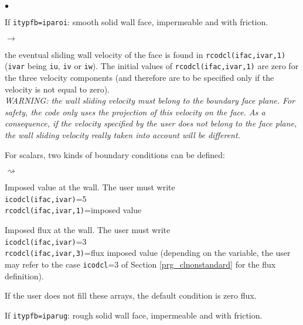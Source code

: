 {{{\begin{list}{$\bullet$}{}
\item If \texttt{itypfb=iparoi}: smooth solid wall face, impermeable and with friction.

\begin{list}{$\rightarrow$}{}
\item the eventual sliding wall velocity of the face is
      found in \texttt{rcodcl(ifac,ivar,1)} (\texttt{ivar} being
      \texttt{iu}, \texttt{iv} or \texttt{iw}). The initial
      values of \texttt{rcodcl(ifac,ivar,1)} are zero for
      the three velocity components (and therefore are to be specified
      only if the velocity is not equal to zero). \\
{\em WARNING: the wall sliding velocity must belong to the boundary face
      plane. For safety, the code only uses the projection of this
      velocity on the face. As a consequence, if the velocity specified
      by the user does not belong to the face plane, the wall sliding velocity really
      taken into account will be different.}

\item For scalars, two kinds of boundary conditions can be
      defined:
\begin{list}{$\rightsquigarrow$}{}
\item Imposed value at the wall. The user must write\\
\hspace*{1cm}\texttt{icodcl(ifac,ivar)}=5\\
\hspace*{1cm}\texttt{rcodcl(ifac,ivar,1)}=imposed value\\
\item Imposed flux at the wall. The user must write\\
\hspace*{1cm}\texttt{icodcl(ifac,ivar)}=3\\
\hspace*{1cm}\texttt{rcodcl(ifac,ivar,3)}=flux imposed value (depending on the variable, the user may refer to the case \texttt{icodcl}=3 of Section \ref{prg_clnonstandard} for the flux definition).
\item If the user does not fill these arrays, the default condition
      is zero flux.
\end{list}
\end{list}

\item If \texttt{itypfb=iparug}: rough solid wall face, impermeable and with friction.


\end{list}}}}
